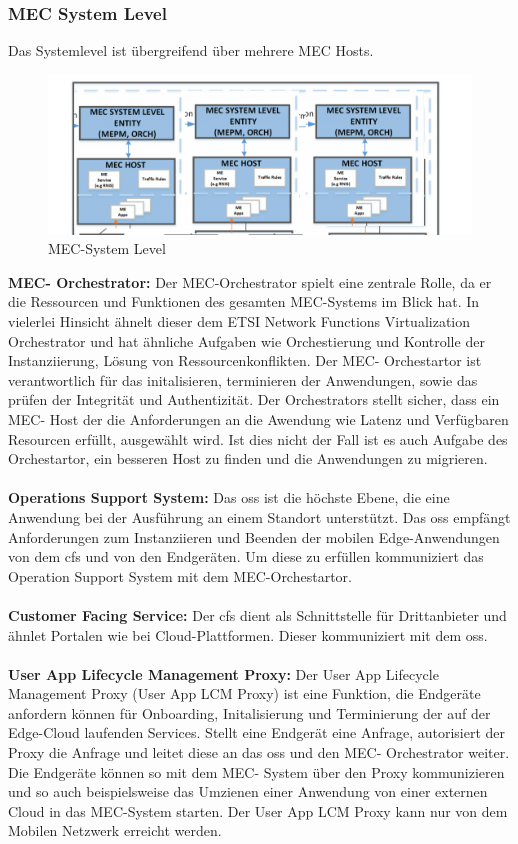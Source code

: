 \documentclass[runningheads]{llncs}
\numberwithin{figure}{section}
\begin{document}
\subsubsection{MEC System Level}
Das Systemlevel ist übergreifend über mehrere MEC Hosts. 
\begin{figure}
  \includegraphics[width=\linewidth]{images/mec-System-Level.png}
  \caption{MEC-System Level}
  \label{fig:mec-System-Level}
\end{figure}
\textbf{MEC- Orchestrator:}
Der MEC-Orchestrator spielt eine zentrale Rolle, 
da er die Ressourcen und Funktionen des gesamten MEC-Systems im Blick hat. 
In vielerlei Hinsicht ähnelt dieser dem ETSI Network Functions Virtualization Orchestrator und hat ähnliche 
Aufgaben wie Orchestierung und Kontrolle der Instanziierung, Lösung von Ressourcenkonflikten.
Der MEC- Orchestartor ist verantwortlich für das initalisieren, terminieren der Anwendungen, sowie das prüfen
der Integrität und Authentizität. Der Orchestrators stellt sicher, 
dass ein MEC- Host der die Anforderungen an die Awendung wie Latenz und Verfügbaren Resourcen erfüllt, ausgewählt wird.
Ist dies nicht der Fall ist es auch Aufgabe des Orchestartor, ein besseren Host zu finden und die Anwendungen zu migrieren.
\\
\\
\textbf{Operations Support System:}
Das \acrfull{oss} ist die höchste Ebene, die eine Anwendung bei der Ausführung an einem Standort unterstützt. 
Das \acrshort{oss} empfängt Anforderungen zum Instanziieren und Beenden der mobilen Edge-Anwendungen von dem \acrfull{cfs} und von den Endgeräten.
Um diese zu erfüllen kommuniziert das Operation Support System mit dem MEC-Orchestartor.
\\
\\
\textbf{Customer Facing Service:}
Der \acrfull{cfs} dient als Schnittstelle für Drittanbieter und ähnlet Portalen wie bei Cloud-Plattformen. 
Dieser kommuniziert mit dem \acrshort{oss}.
\\
\\
\textbf{User App Lifecycle Management Proxy:} 
Der User App Lifecycle Management Proxy (User App LCM Proxy) ist eine Funktion, die Endgeräte anfordern können für Onboarding, Initalisierung und Terminierung der auf der
Edge-Cloud laufenden Services. Stellt eine Endgerät eine Anfrage, autorisiert der Proxy die Anfrage und leitet diese an das \acrshort{oss} und den MEC- Orchestrator weiter. 
Die Endgeräte können so mit dem MEC- System über den Proxy kommunizieren und so auch beispielsweise das Umzienen einer Anwendung von 
einer externen Cloud in das MEC-System starten. Der User App LCM Proxy kann nur von dem Mobilen Netzwerk erreicht werden.
\end{document}
